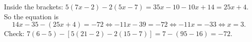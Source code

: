 Inside the brackets: $5(7x-2)-2(5x-7)=35x-10-10x+14=25x+4$. So the equation is
\[
14x-35-(25x+4)=-72\iff -11x-39=-72\iff -11x=-33\iff x=\boxed{3}.
\]
Check: $7(6-5)-[5(21-2)-2(15-7)]=7-(95-16)=-72$.
